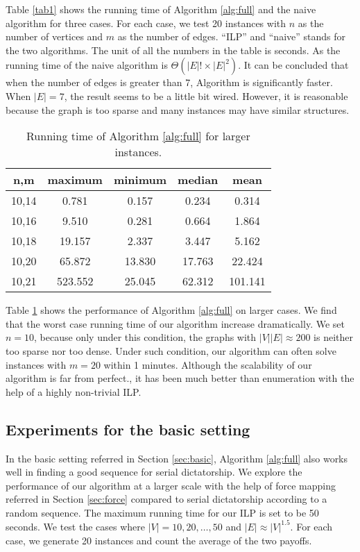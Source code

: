 \documentclass[letterpaper]{article}
\begin{document}
Table \ref{tab1} shows the running time of Algorithm \ref{alg:full} and the naive algorithm for three cases.
For each case, we test 20 instances with $n$ as the number of vertices and $m$ as the number of edges.
``ILP'' and ``naive'' stands for the two algorithms.
The unit of all the numbers in the table is seconds.
As the running time of the naive algorithm is $\Theta(|E|!\times |E|^2)$.
It can be concluded that when the number of edges is greater than 7, Algorithm is significantly faster.
When $|E|=7$, the result seems to be a little bit wired.
However, it is reasonable because the graph is too sparse and many instances may have similar structures.

\begin{table}
	\caption{Running time of Algorithm \ref{alg:full} for larger instances.}
	\label{tab2}
	\begin{tabular}{ccccc}
		\hline
		n,m & maximum & minimum & median & mean\\ \hline
		10,14 & 0.781&0.157&0.234&0.314\\
		10,16 & 9.510&0.281&0.664&1.864\\
		10,18 & 19.157&2.337&3.447&5.162\\
		10,20 & 65.872&13.830&17.763&22.424\\
		10,21 & 523.552&25.045&62.312&101.141\\ \hline
	\end{tabular}
\end{table}

Table \ref{tab2} shows the performance of Algorithm \ref{alg:full} on larger cases.
We find that the worst case running time of our algorithm increase dramatically.
We set $n=10$, because only under this condition, the graphs with $|V||E|\approx200$ is neither too sparse nor too dense.
Under such condition, our algorithm can often solve instances with $m=20$ within 1 minutes.
Although the scalability of our algorithm is far from perfect., it has been much better than enumeration with the help of a highly non-trivial ILP.

\subsection{Experiments for the basic setting}

In the basic setting referred in Section \ref{sec:basic}, Algorithm \ref{alg:full} also works well in finding a good sequence for serial dictatorship.
We explore the performance of our algorithm at a larger scale with the help of force mapping referred in Section \ref{sec:force} compared to serial dictatorship according to a random sequence.
The maximum running time for our ILP is set to be 50 seconds. We test the cases where $|V|=10,20,\ldots,50$ and $|E|\approx|V|^{1.5}$. For each case, we generate 20 instances and count the average of the two payoffs.
\end{document}
